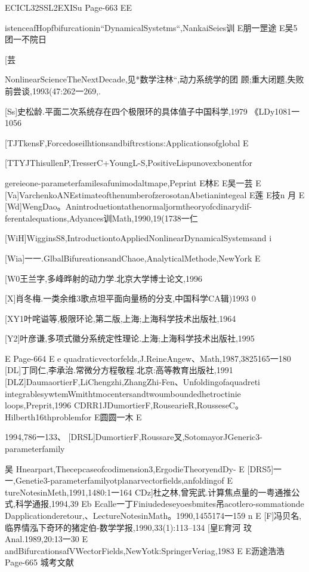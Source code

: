 ECICL32SSL2EXISu
Page-663
EE

istenceafHopfbifurcationin“DynamicalSystetms“,NankaiSeies训
E朋一罡途
E吴5团一不院日

[芸

NonlinearScienceTheNextDecade,见*数学注林“,动力系统学的团
顾;重大闭题,失败前尝谈,1993(47:262一269,.

[Ss]史松龄.平面二次系统存在四个极限环的具体值子中国科学,1979
《LDy1081一1056

[TJTkensF,Forcedoseilhtionsandbiftrcstions:Applicationsofglobal
E

[TTYJThisullenP,TresserC+YoungL-S,PositiveLispunovexbonentfor

gereieone-parameterfamilesafunimodaltmape,Peprint
E林E
E吴一芸
E
[Va]VarchenkoANEstimateofthenumberofzerosotanAbetianintegeal
E莲
E技n
月
E
[Wd]WengDao。Anintroduetiontathenormaljormtheoryofcdinarydif-
ferentalequations,Adyances训Math,1990,19(1738一仁

[WiH]WigginsS8,IntroductiontoAppliedNonlinearDynamicalSystemsand
i

[Wia]一一.GlbalBifureationsandChaoe,AnalyticalMethode,NewYork
E

[W0王兰字,多峰晔射的动力学.北京大学博士论文,1996

[X]肖冬梅.一类余维3歌点坦平面向量杨的分支,中国科学CA辑)1993
0

[XY1叶咤谥等,极限环论,第二版,上海;上海科学技术出版社,1964

[Y2]叶彦谦,多项式徽分系统定性理论.上海;上海科学技术出版社,1995

E
Page-664
E
e
quadraticvectorfelds,J.ReineAngew、Math,1987,3825165一180
[DL]丁同仁,李承治.常微分方程敬程.北京:高等教育出版社,1991
[DLZ]DaumaortierF,LiChengzhi,ZhangZhi-Fen、Unfoldingofaquadreti
integrablesywtemWmithtmocentersandtwoumboundedhetroctinie
loops,Preprit,1996
CDRR1JDumortierF,RousearieR,RousseseC。Hilberth16thproblemfor
E圆圆一木
E

1994,786一133、
[DRSL]DumortierF,Roussare叉,SotomayorJGeneric3-parameterfamily

吴
Hnearpart,Thecepcaseofcodimension3,ErgodieTheoryendDy-
E
[DRS5]一一,Genetie3-parameterfamilyotplanarvectorfields,anfoldingof
E
tureNotesinMeth,1991,1480:1一164
CDz]杜之林,曾宪武.计算焦点量的一粤通推公式,科学通报,1994,39
Eb
Ecalle一丁Finiudedeseyoesbmites吊acotlero-sommationde
Dapplicationderetour,、LectureNotesinMath。1990,1455174一159
n
E
[F]冯贝名,临界情泓下奇环的猪定伯-数学学报,1990,33(1):113--134
[皇E育河
玟
Anal.1989,20:13一30
E
andBifurcationsafVWectorFields,NewYotk:SpringerVeriag,1983
E
E沥途浩浩
Page-665
城考文献

